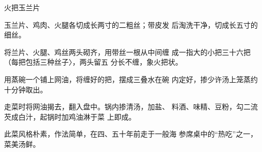 \begin{recipe}{火把玉兰片}

\ingredients



\cooking

\step 	玉兰片、鸡肉、火腿各切成长两寸的二粗丝；带皮发 后淘洗干净，切成长五寸的细丝。

\step 	将兰片、火腿、鸡丝两头砌齐，用带丝一根从中间缠 成一指大的小把三十六把（每把包括三种丝子〉，两头留五 分长不缠，象火把状。

\step 	用蒸碗一个铺上网油，将缠好的把，摆成三叠水在碗 内定好，掺少许汤上笼蒸约十分钟取出。

\step 	走菜时将网油揭去，翻入盘中。锅内掺清汤，加盐、 料酒、味精、豆粉，勾二流芡成白汁，起锅时加鸡油淋于菜 上即成。

\notes

此菜风格朴素，作法简单，在四、五十年前走于一般海 参席桌中的“热吃”之一，菜美汤鲜。

\end{recipe}

